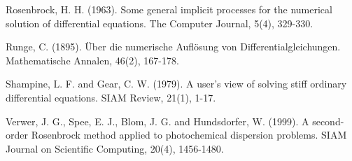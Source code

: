 \documentclass[11pt,a4paper]{article}
\begin{document}
\begin{thebibliography}{99}
 Rosenbrock, H. H. (1963). Some general implicit processes for the numerical solution of differential equations. The Computer Journal, 5(4), 329-330.

 Runge, C. (1895). {\"U}ber die numerische Aufl{\"o}sung von Differentialgleichungen. Mathematische Annalen, 46(2), 167-178.

 Shampine, L. F. and Gear, C. W. (1979). A user's view of solving stiff ordinary differential equations. SIAM Review, 21(1), 1-17.

 Verwer, J. G., Spee, E. J., Blom, J. G. and Hundsdorfer, W. (1999). A second-order Rosenbrock method applied to photochemical dispersion problems. SIAM Journal on Scientific Computing, 20(4), 1456-1480.

\end{thebibliography}
\end{document}
